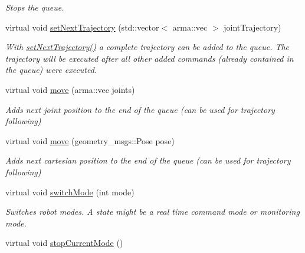 \begin{DoxyCompactItemize}
\begin{DoxyCompactList}\small\item\em Stops the queue. \end{DoxyCompactList}\item 
\hypertarget{classkukadu_1_1ControlQueue_a0025c5c010a1b33d637e52fb24f767b2}{virtual void \hyperlink{classkukadu_1_1ControlQueue_a0025c5c010a1b33d637e52fb24f767b2}{set\-Next\-Trajectory} (std\-::vector$<$ arma\-::vec $>$ joint\-Trajectory)}\label{classkukadu_1_1ControlQueue_a0025c5c010a1b33d637e52fb24f767b2}

\begin{DoxyCompactList}\small\item\em With \hyperlink{classkukadu_1_1ControlQueue_a0025c5c010a1b33d637e52fb24f767b2}{set\-Next\-Trajectory()} a complete trajectory can be added to the queue. The trajectory will be executed after all other added commands (already contained in the queue) were executed. \end{DoxyCompactList}\item 
virtual void \hyperlink{classkukadu_1_1ControlQueue_aca70a978b2950d7c9ab99d55c5977eec}{move} (arma\-::vec joints)
\begin{DoxyCompactList}\small\item\em Adds next joint position to the end of the queue (can be used for trajectory following) \end{DoxyCompactList}\item 
virtual void \hyperlink{classkukadu_1_1ControlQueue_a62b3e0c02b1937b09ae538a71ee0e855}{move} (geometry\-\_\-msgs\-::\-Pose pose)
\begin{DoxyCompactList}\small\item\em Adds next cartesian position to the end of the queue (can be used for trajectory following) \end{DoxyCompactList}\item 
virtual void \hyperlink{classkukadu_1_1ControlQueue_a5defe63d9f1b9829676f9a31a4683911}{switch\-Mode} (int mode)
\begin{DoxyCompactList}\small\item\em Switches robot modes. A state might be a real time command mode or monitoring mode. \end{DoxyCompactList}\item 
\hypertarget{classkukadu_1_1ControlQueue_ae4236dc4c31aff57d2295dd11dbf453b}{virtual void \hyperlink{classkukadu_1_1ControlQueue_ae4236dc4c31aff57d2295dd11dbf453b}{stop\-Current\-Mode} ()}\label{classkukadu_1_1ControlQueue_ae4236dc4c31aff57d2295dd11dbf453b}


\end{DoxyCompactItemize}
